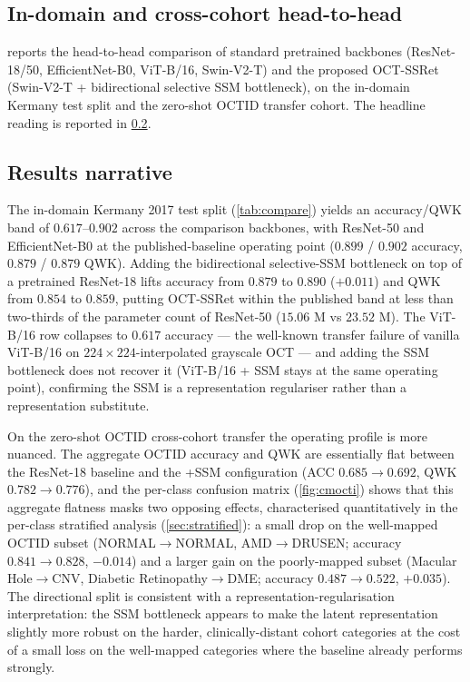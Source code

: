 \documentclass[5p]{elsarticle}
\begin{document}
\subsection{In-domain and cross-cohort head-to-head}
 reports the head-to-head comparison of standard pretrained backbones (ResNet-18/50, EfficientNet-B0, ViT-B/16, Swin-V2-T) and the proposed OCT-SSRet (Swin-V2-T + bidirectional selective SSM bottleneck), on the in-domain Kermany test split and the zero-shot OCTID transfer cohort. The headline reading is reported in \cref{sec:results-narrative}.



\subsection{Results narrative}
\label{sec:results-narrative}
The in-domain Kermany 2017 test split (\cref{tab:compare}) yields an accuracy/QWK band of $0.617$--$0.902$ across the comparison backbones, with ResNet-50 and EfficientNet-B0 at the published-baseline operating point ($0.899$ / $0.902$ accuracy, $0.879$ / $0.879$ QWK). Adding the bidirectional selective-SSM bottleneck on top of a pretrained ResNet-18 lifts accuracy from $0.879$ to $0.890$ ($+0.011$) and QWK from $0.854$ to $0.859$, putting OCT-SSRet within the published band at less than two-thirds of the parameter count of ResNet-50 ($15.06$ M vs $23.52$ M). The ViT-B/16 row collapses to $0.617$ accuracy --- the well-known transfer failure of vanilla ViT-B/16 on $224\!\times\!224$-interpolated grayscale OCT --- and adding the SSM bottleneck does not recover it (ViT-B/16 + SSM stays at the same operating point), confirming the SSM is a representation regulariser rather than a representation substitute.

On the zero-shot OCTID cross-cohort transfer the operating profile is more nuanced. The aggregate OCTID accuracy and QWK are essentially flat between the ResNet-18 baseline and the +SSM configuration (ACC $0.685\!\rightarrow\!0.692$, QWK $0.782\!\rightarrow\!0.776$), and the per-class confusion matrix (\cref{fig:cmocti}) shows that this aggregate flatness masks two opposing effects, characterised quantitatively in the per-class stratified analysis (\cref{sec:stratified}): a small drop on the well-mapped OCTID subset (NORMAL$\rightarrow$NORMAL, AMD$\rightarrow$DRUSEN; accuracy $0.841\!\rightarrow\!0.828$, $-0.014$) and a larger gain on the poorly-mapped subset (Macular Hole$\rightarrow$CNV, Diabetic Retinopathy$\rightarrow$DME; accuracy $0.487\!\rightarrow\!0.522$, $+0.035$). The directional split is consistent with a representation-regularisation interpretation: the SSM bottleneck appears to make the latent representation slightly more robust on the harder, clinically-distant cohort categories at the cost of a small loss on the well-mapped categories where the baseline already performs strongly.
\end{document}
